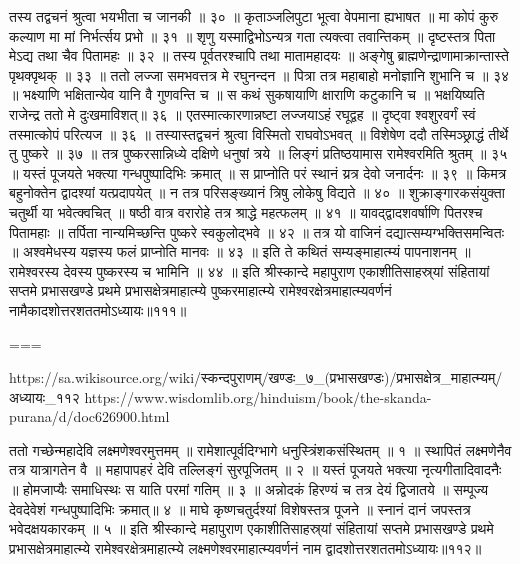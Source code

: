 तस्य तद्वचनं श्रुत्वा भयभीता च जानकी ॥ ३० ॥
कृताञ्जलिपुटा भूत्वा वेपमाना ह्यभाषत ॥
मा कोपं कुरु कल्याण मा मां निर्भर्त्सय प्रभो ॥ ३१ ॥
शृणु यस्माद्विभोऽन्यत्र गता त्यक्त्वा तवान्तिकम् ॥
दृष्टस्तत्र पिता मेऽद्य तथा चैव पितामहः ॥ ३२ ॥
तस्य पूर्वतरश्चापि तथा मातामहादयः ॥
अङ्गेषु ब्राह्मणेन्द्राणामाक्रान्तास्ते पृथक्पृथक् ॥ ३३ ॥
ततो लज्जा समभवत्तत्र मे रघुनन्दन ॥
पित्रा तत्र महाबाहो मनोज्ञानि शुभानि च ॥ ३४ ॥
भक्ष्याणि भक्षितान्येव यानि वै गुणवन्ति च ॥
स कथं सुकषायाणि क्षाराणि कटुकानि च ॥
भक्षयिष्यति राजेन्द्र ततो मे दुःखमाविशत्॥ ३६ ॥
एतस्मात्कारणान्नष्टा लज्जयाऽहं रघूद्वह ॥
दृष्ट्वा श्वशुरवर्गं स्वं तस्मात्कोपं परित्यज ॥ ३६ ॥
तस्यास्तद्वचनं श्रुत्वा विस्मितो राघवोऽभवत् ॥
विशेषेण ददौ तस्मिञ्छ्राद्धं तीर्थे तु पुष्करे ॥ ३७ ॥
तत्र पुष्करसान्निध्ये दक्षिणे धनुषां त्रये ॥
लिङ्गं प्रतिष्ठयामास रामेश्वरमिति श्रुतम् ॥ ३५ ॥
यस्तं पूजयते भक्त्या गन्धपुष्पादिभिः क्रमात् ॥
स प्राप्नोति परं स्थानं य्रत्र देवो जनार्दनः ॥ ३९ ॥
किमत्र बहुनोक्तेन द्वादश्यां यत्प्रदापयेत् ॥
न तत्र परिसङ्ख्यानं त्रिषु लोकेषु विद्यते ॥ ४० ॥
शुक्राङ्गारकसंयुक्ता चतुर्थी या भवेत्क्वचित् ॥
षष्ठी वात्र वरारोहे तत्र श्राद्धे महत्फलम् ॥ ४१ ॥
यावद्द्वादशवर्षाणि पितरश्च पितामहाः ॥
तर्पिता नान्यमिच्छन्ति पुष्करे स्वकुलोद्भवे ॥ ४२ ॥
तत्र यो वाजिनं दद्यात्सम्यग्भक्तिसमन्वितः ॥
अश्वमेधस्य यज्ञस्य फलं प्राप्नोति मानवः ॥ ४३ ॥
इति ते कथितं सम्यङ्माहात्म्यं पापनाशनम् ॥
रामेश्वरस्य देवस्य पुष्करस्य च भामिनि ॥ ४४ ॥
इति श्रीस्कान्दे महापुराण एकाशीतिसाहस्र्यां संहितायां सप्तमे प्रभासखण्डे प्रथमे प्रभासक्षेत्रमाहात्म्ये पुष्करमाहात्म्ये रामेश्वरक्षेत्रमाहात्म्यवर्णनं नामैकादशोत्तरशततमोऽध्यायः॥१११॥

===

https://sa.wikisource.org/wiki/स्कन्दपुराणम्/खण्डः_७_(प्रभासखण्डः)/प्रभासक्षेत्र_माहात्म्यम्/अध्यायः_११२
https://www.wisdomlib.org/hinduism/book/the-skanda-purana/d/doc626900.html



ततो गच्छेन्महादेवि लक्ष्मणेश्वरमुत्तमम् ॥
रामेशात्पूर्वदिग्भागे धनुस्त्रिंशकसंस्थितम् ॥ १ ॥
स्थापितं लक्ष्मणेनैव तत्र यात्रागतेन वै ॥
महापापहरं देवि तल्लिङ्गं सुरपूजितम् ॥ २ ॥
यस्तं पूजयते भक्त्या नृत्यगीतादिवादनैः ॥
होमजाप्यैः समाधिस्थः स याति परमां गतिम् ॥ ३ ॥
अन्नोदकं हिरण्यं च तत्र देयं द्विजातये ॥
सम्पूज्य देवदेवेशं गन्धपुष्पादिभिः क्रमात्॥ ४ ॥
माघे कृष्णचतुर्दश्यां विशेषस्तत्र पूजने ॥
स्नानं दानं जपस्तत्र भवेदक्षयकारकम् ॥ ५ ॥
इति श्रीस्कान्दे महापुराण एकाशीतिसाहस्र्यां संहितायां सप्तमे प्रभासखण्डे प्रथमे प्रभासक्षेत्रमाहात्म्ये रामेश्वरक्षेत्रमाहात्म्ये लक्ष्मणेश्वरमाहात्म्यवर्णनं नाम द्वादशोत्तरशततमोऽध्यायः॥११२॥



